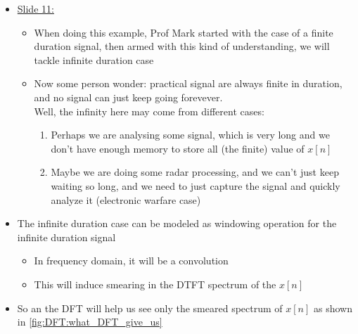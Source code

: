 \documentclass[12pt,a4paper]{book}
\begin{document}
\begin{itemize}
    
\item \underline{Slide 11:}
    
        \begin{itemize}
            \item When doing this example, Prof Mark started with the case of a finite duration signal, then armed with this kind of understanding, we will tackle infinite duration case
            
            
            \item Now some person wonder: practical signal are always finite in duration, and no signal can just keep going forevever.\\
            
            Well, the infinity here may come from different cases:
            
            
            \begin{enumerate}
                \item Perhaps we are analysing some signal, which is very long and we don't have enough memory to store all (the finite) value of $x[n]$
                
                \item Maybe we are doing some radar processing, and we can't just keep waiting so long, and we need to just capture the signal and quickly analyze it (electronic warfare case)
            \end{enumerate}
            
            
        \end{itemize}
    

\item The infinite duration case can be modeled as windowing operation for the infinite duration signal 

    \begin{itemize}
        \item In frequency domain, it will be a convolution
        
        \item This will induce smearing in the DTFT spectrum of the $x[n]$
    \end{itemize}
   
   
   
\newpage    
\item So an  the DFT will help us see only the smeared spectrum of $x[n]$ as shown in \autoref{fig:DFT:what_DFT_give_us}


\end{itemize}
\end{document}
